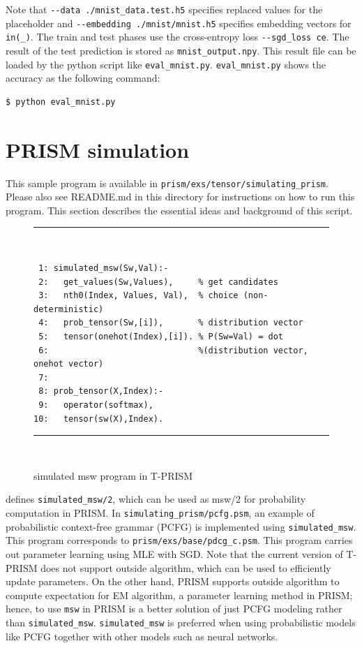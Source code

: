 \documentclass[a4paper]{report}
\begin{document}
Note that \verb|--data ./mnist_data.test.h5|
specifies replaced values for the placeholder and 
\verb|--embedding ./mnist/mnist.h5| specifies embedding vectors for {\tt in(\_)}.
The train and test phases use the cross-entropy loss \verb|--sgd_loss ce|.
The result of the test prediction is stored as {\tt mnist\_output.npy}.
This result file can be loaded by the python script like \verb|eval_mnist.py|.
\verb|eval_mnist.py| shows the accuracy as the following command:
\begin{verbatim}
$ python eval_mnist.py
\end{verbatim}


\section{PRISM simulation}
\label{sec:simulated_msw}

This sample program is available in \verb|prism/exs/tensor/simulating_prism|.
Please also see README.md in this directory for instructions on how to run this program.
This section describes the essential ideas and background of this script.


\begin{figure}[tb]
	\rule{0.85\textwidth}{0.10mm}\\ [-1em]
	\begin{verbatim}
 1: simulated_msw(Sw,Val):-
 2:   get_values(Sw,Values),     % get candidates
 3:   nth0(Index, Values, Val),  % choice (non-deterministic)
 4:   prob_tensor(Sw,[i]),       % distribution vector
 5:   tensor(onehot(Index),[i]). % P(Sw=Val) = dot
 6:                              %(distribution vector, onehot vector)
 7: 
 8: prob_tensor(X,Index):-
 9:   operator(softmax),
10:   tensor(sw(X),Index).
	\end{verbatim}
	\rule{0.85\textwidth}{0.10mm}\\ [-1em]
	\caption{simulated msw program in T-PRISM}
	\label{fig:simulated_msw}
\end{figure}

 defines {\tt simulated\_msw/2}, which can be used as {msw/2} for probability computation in PRISM.
In {\tt simulating\_prism/pcfg.psm}, an example of probabilistic context-free grammar (PCFG) is implemented using {\tt simulated\_msw}.
This program corresponds to {\tt prism/exs/base/pdcg\_c.psm}.
This program carries out parameter learning using MLE with SGD. 
Note that the current version of T-PRISM does not support outside algorithm, which can be used to efficiently update parameters.
On the other hand, PRISM supports outside algorithm to compute expectation for EM algorithm, a parameter learning method in PRISM; hence, to use {\tt msw} in PRISM is a better solution of just PCFG modeling rather than {\tt simulated\_msw}.
{\tt simulated\_msw} is preferred when using probabilistic models like PCFG together with other models such as neural networks.
  




\end{document}
